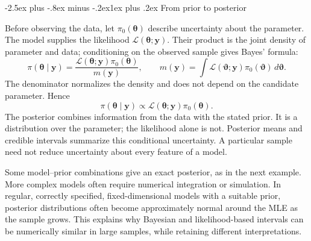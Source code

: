 \documentclass[
  11pt,
]{book}
\makeatletter
\renewcommand\subsection{\@startsection{subsection}{2}{\z@}
  {-2.5ex plus -.8ex minus -.2ex}{1ex plus .2ex}
  {\normalfont\large\bfseries\color{TextbookInk}}}
\theoremstyle{definition}
\theoremstyle{definition}
\theoremstyle{definition}
\theoremstyle{definition}
\theoremstyle{remark}
\makeatother
\begin{document}
\subsection{From prior to posterior}\label{from-prior-to-posterior}

Before observing the data, let \(\pi_0(\boldsymbol\theta)\) describe uncertainty about the parameter. The model supplies the likelihood \(\mathcal L(\boldsymbol\theta;\mathbf{y})\). Their product is the joint density of parameter and data; conditioning on the observed sample gives Bayes' formula:
\begin{equation}
\pi(\boldsymbol\theta\mid\mathbf{y})=
\frac{\mathcal L(\boldsymbol\theta;\mathbf{y})\pi_0(\boldsymbol\theta)}{m(\mathbf{y})},\qquad
m(\mathbf{y})=\int\mathcal L(\boldsymbol\vartheta;\mathbf{y})\pi_0(\boldsymbol\vartheta)\,d\boldsymbol\vartheta.
\label{eq:post1}
\end{equation}
The denominator normalizes the density and does not depend on the candidate parameter. Hence
\begin{equation}
\pi(\boldsymbol\theta\mid\mathbf{y})\propto
\mathcal L(\boldsymbol\theta;\mathbf{y})\pi_0(\boldsymbol\theta).
\label{eq:post2}
\end{equation}
The posterior combines information from the data with the stated prior. It is a distribution over the parameter; the likelihood alone is not. Posterior means and credible intervals summarize this conditional uncertainty. A particular sample need not reduce uncertainty about every feature of a model.

Some model--prior combinations give an exact posterior, as in the next example. More complex models often require numerical integration or simulation. In regular, correctly specified, fixed-dimensional models with a suitable prior, posterior distributions often become approximately normal around the MLE as the sample grows. This explains why Bayesian and likelihood-based intervals can be numerically similar in large samples, while retaining different interpretations.
\end{document}

